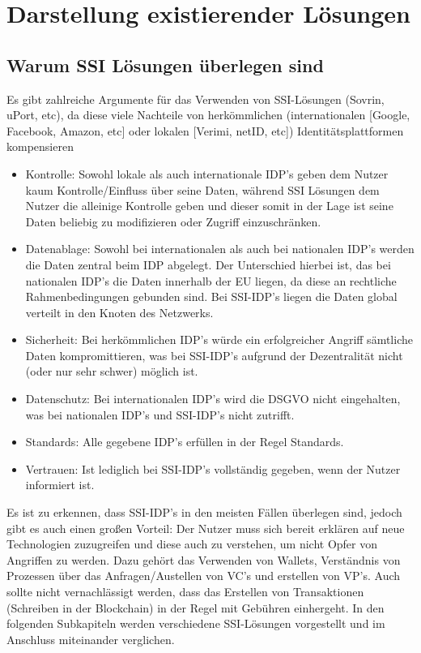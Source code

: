 \chapter{Darstellung existierender Lösungen}
\label{cha:existierende Lösungen}

\section{Warum SSI Lösungen überlegen sind}
Es gibt zahlreiche Argumente für das Verwenden von SSI-Lösungen (Sovrin, uPort, etc), da diese viele Nachteile von herkömmlichen (internationalen [Google, Facebook, Amazon, etc] oder lokalen [Verimi, netID, etc]) Identitätsplattformen kompensieren

\begin{itemize}
	\item Kontrolle: Sowohl lokale als auch internationale IDP's geben dem Nutzer kaum Kontrolle/Einfluss über seine Daten, während SSI Lösungen dem Nutzer die alleinige Kontrolle geben und dieser somit in der Lage ist seine Daten beliebig zu modifizieren oder Zugriff einzuschränken.
	
	\item Datenablage: Sowohl bei internationalen als auch bei nationalen IDP's werden die Daten zentral beim IDP abgelegt. Der Unterschied hierbei ist, das bei nationalen IDP's die Daten innerhalb der EU liegen, da diese an rechtliche Rahmenbedingungen gebunden sind. Bei SSI-IDP's liegen die Daten global verteilt in den Knoten des Netzwerks.
	
	\item Sicherheit: Bei herkömmlichen IDP's würde ein erfolgreicher Angriff sämtliche Daten kompromittieren, was bei SSI-IDP's aufgrund der Dezentralität nicht (oder nur sehr schwer) möglich ist.
	
	\item Datenschutz: Bei internationalen IDP's wird die DSGVO nicht eingehalten, was bei nationalen IDP's und SSI-IDP's nicht zutrifft.

	\item Standards: Alle gegebene IDP's erfüllen in der Regel Standards.
	
	\item Vertrauen: Ist lediglich bei SSI-IDP's vollständig gegeben, wenn der Nutzer informiert ist.  
\end{itemize}

Es ist zu erkennen, dass SSI-IDP's in den meisten Fällen überlegen sind, jedoch gibt es auch einen großen Vorteil: Der Nutzer muss sich bereit erklären auf neue Technologien zuzugreifen und diese auch zu verstehen, um nicht Opfer von Angriffen zu werden. Dazu gehört das Verwenden von Wallets, Verständnis von Prozessen über das Anfragen/Austellen von VC's und erstellen von VP's. Auch sollte nicht vernachlässigt werden, dass das Erstellen von Transaktionen (Schreiben in der Blockchain) in der Regel mit Gebühren einhergeht. In den folgenden Subkapiteln werden verschiedene SSI-Lösungen vorgestellt und im Anschluss miteinander verglichen.


